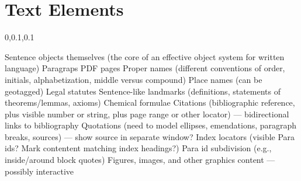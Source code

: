 
\section{Text Elements}\fbeg{}\begin{frame}{}


\vspace{-.5em}	

{\Large{}\selectfont

\hspace*{15pt}\begin{minipage}{.97\textwidth}
\vspace{4pt}
		
\begin{lightquadblockc}{0,0.1,0.1}{\parbox{21cm}{\centering \vspace{3pt}}}
\begin{center}\begin{minipage}{1.1\textwidth}
{\fontsize{19}{22}\selectfont \setlength{\leftmargini}{30pt}\begin{enumerate}
\dkitem {\dksp} Sentence objects themselves (the core of an effective object system for written language) %
 {\dksp}{\dksp}{\dksp}{\dksp}  \dmark{} {\dksp} Paragraps   {\dksp}{\dksp}{\dksp}{\dksp}  \dmark{} {\dksp} PDF pages   
\vspace{8pt} 
\dkitem {\dksp} Proper names (different conventions of order, initials, alphabetization, middle versus compound)
\vspace{8pt}
\dkitem {\dksp} Place names (can be geotagged) %
 {\dksp}{\dksp}{\dksp}{\dksp}{\dksp}{\dksp}{\dksp}  \dmark{} {\dksp} Legal statutes
\vspace{8pt}
\dkitem {\dksp} Sentence-like landmarks (definitions, statements of theorems/lemmas, axioms) %
 {\dksp}{\dksp}{\dksp}{\dksp}{\dksp}{\dksp}{\dksp}  \dmark{} {\dksp} Chemical formulae
\vspace{8pt}
\dkitem {\dksp} Citations (bibliographic reference, plus visible number or string, plus page range or other locator) 
 --- bidirectional links to bibliography
\vspace{8pt}
\dkitem {\dksp} Quotations (need to model ellipses, emendations, paragraph breaks, sources) 
--- show source in separate window?
\vspace{8pt}
\dkitem {\dksp} Index locators (visible Para ids?  Mark contentent matching index headings?) %
 {\dksp}{\dksp} \dmark{} {\dksp} Para id subdivision (e.g., inside/around block quotes)
\vspace{8pt}
\dkitem {\dksp} Figures, images, and other graphics content --- possibly interactive


\end{enumerate}}
\end{minipage}
\end{center}
\end{lightquadblockc}
\end{minipage}}
\end{frame}
